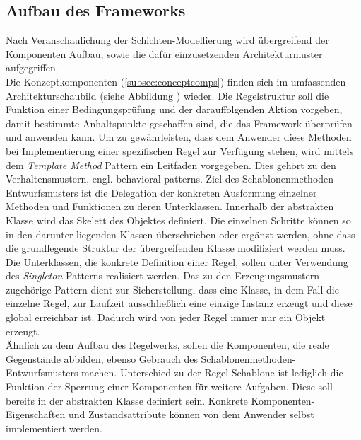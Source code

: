     \subsection{Aufbau des Frameworks}
        Nach Veranschaulichung der Schichten-Modellierung wird übergreifend der Komponenten Aufbau, sowie die dafür einzusetzenden Architekturmuster aufgegriffen. 
        \\
        Die Konzeptkomponenten (\ref{subsec:conceptcomps}) finden sich im umfassenden Architekturschaubild (siehe Abbildung %
        ) wieder. Die Regelstruktur 
        soll die Funktion einer Bedingungsprüfung und der darauffolgenden Aktion vorgeben, damit bestimmte Anhaltspunkte geschaffen sind, die das Framework überprüfen 
        und anwenden kann. Um zu gewährleisten, dass dem Anwender diese Methoden bei Implementierung einer spezifischen Regel zur Verfügung stehen, wird mittels dem 
        \textit{Template Method} Pattern \cite{gamma1995template} ein Leitfaden vorgegeben. Dies gehört zu den Verhaltensmustern, engl. behavioral patterns. 
        Ziel des Schablonenmethoden-Entwurfsmusters ist die Delegation der konkreten Ausformung einzelner Methoden und Funktionen zu deren Unterklassen. Innerhalb der 
        abstrakten Klasse wird das Skelett des Objektes definiert. Die einzelnen Schritte können so in den darunter liegenden Klassen überschrieben oder ergänzt 
        werden, ohne dass die grundlegende Struktur der übergreifenden Klasse modifiziert werden muss. Die Unterklassen, die konkrete Definition einer Regel, sollen 
        unter Verwendung des \textit{Singleton} Patterns \cite{gamma1995singleton} realisiert werden. Das zu den Erzeugungsmustern 
        zugehörige Pattern dient zur 
        Sicherstellung, dass eine Klasse, in dem Fall die einzelne Regel, zur Laufzeit ausschließlich eine einzige Instanz erzeugt und diese global erreichbar ist. 
        Dadurch wird von jeder Regel immer nur ein Objekt erzeugt. 
        \\
        \linebreak
        Ähnlich zu dem Aufbau des Regelwerks, sollen die Komponenten, die reale Gegenstände abbilden, ebenso Gebrauch des Schablonenmethoden-Entwurfsmusters machen. 
        Unterschied zu der Regel-Schablone ist lediglich die Funktion der Sperrung einer Komponenten für weitere Aufgaben. Diese soll bereits in der abstrakten Klasse 
        definiert sein. Konkrete Komponenten-Eigenschaften und Zustandsattribute können von dem Anwender selbst implementiert werden.
        \\
